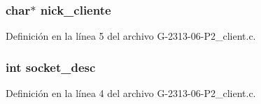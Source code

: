 \subsubsection[{\texorpdfstring{nick\+\_\+cliente}{nick_cliente}}]{\setlength{\rightskip}{0pt plus 5cm}char$\ast$ nick\+\_\+cliente}\hypertarget{G-2313-06-P2__files_8c_ab93a317ee9a27c82844c9128a76b136a}{}\label{G-2313-06-P2__files_8c_ab93a317ee9a27c82844c9128a76b136a}


Definición en la línea 5 del archivo G-\/2313-\/06-\/\+P2\+\_\+client.\+c.

\subsubsection[{\texorpdfstring{socket\+\_\+desc}{socket_desc}}]{\setlength{\rightskip}{0pt plus 5cm}int socket\+\_\+desc}\hypertarget{G-2313-06-P2__files_8c_adeadf7cb6916a10c7142ce7d265ab32a}{}\label{G-2313-06-P2__files_8c_adeadf7cb6916a10c7142ce7d265ab32a}


Definición en la línea 4 del archivo G-\/2313-\/06-\/\+P2\+\_\+client.\+c.


